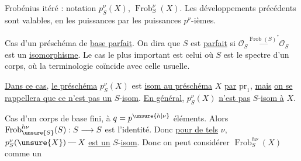 Frobénius itéré : notation $p_S^\nu(X)$, $\operatorname{Frob}_S^\nu(X)$.
Les développements précédents sont valables, en  les
puissances  par les puissances $p^\nu$-ièmes.

Cas d'un préschéma de \uline{base parfait}.
On dira que $S$ est \uline{parfait} si 
$\mathcal O_S\mathbin{\overset{\operatorname{Frob}(S)^*}{\text{---}}}\mathcal O_S$
est un \uline{isomorphisme}.
Le cas le plus important est celui où $S$ est le spectre d'un corps, où
la terminologie coïncide avec celle usuelle.

\uline{Dans ce cas}, \uline{le préschéma} $p_S^\nu(X)$ est
\uline{isom au préschéma} $X$ \uline{par} $\mathrm{pr}_1$, \uline{mais}
\uline{on se rappellera que ce n'est pas un} $S$-\uline{isom}.
\uline{En général}, $p_S^\nu(X)$ \uline{n'est pas}
$S$-\uline{isom à} $X$.

Cas d'un corps de base fini, à $q=p^{\unsure{h|\nu}}$ éléments.
\inserted{$[\deleted{\unsure{\nu=h\nu}}\unsure{\nu\mapsto h\nu}]$}
Alors $\operatorname{Frob}_{\unsure{S}}^{h\nu}(S):S\longrightarrow S$
est l'identité. Donc \uline{pour de tels} $\nu$,
$p_S^\nu(\unsure{X})\mathbin{\text{---}}X$ \uline{est un} $S$-\uline{isom}.
Donc on peut considérer $\operatorname{Frob}_S^{h\nu}(X)$ comme un
